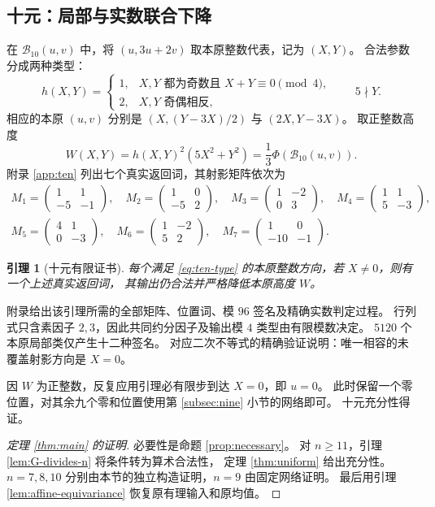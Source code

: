 \documentclass[UTF8,fontset=fandol,zihao=-4,a4paper]{ctexart}
\numberwithin{equation}{section}
\newtheorem{lemma}[theorem]{引理}
\theoremstyle{definition}
\newcommand{\B}{\mathcal B}
\newcommand{\mat}[4]{\begin{pmatrix}#1&#2\\#3&#4\end{pmatrix}}
\begin{document}
\subsection{十元：局部与实数联合下降}\label{subsec:ten-descent}

在 $\B_{10}(u,v)$ 中，将 $(u,3u+2v)$ 取本原整数代表，记为 $(X,Y)$。
合法参数分成两种类型：
\begin{equation}\label{eq:ten-type}
 h(X,Y)=
 \begin{cases}
 1,&X,Y\text{ 都为奇数且 }X+Y\equiv0\pmod4,\\
 2,&X,Y\text{ 奇偶相反},
 \end{cases}
 \qquad 5\nmid Y.
\end{equation}
相应的本原 $(u,v)$ 分别是
$(X,(Y-3X)/2)$ 与 $(2X,Y-3X)$。
取正整数高度
\begin{equation}\label{eq:ten-height}
 W(X,Y)=h(X,Y)^2(5X^2+Y^2)=\frac13\Phi(\B_{10}(u,v)).
\end{equation}
附录 \ref{app:ten} 列出七个真实返回词，其射影矩阵依次为
\begin{equation}\label{eq:ten-matrices}
\begin{gathered}
 M_1=\mat{1}{1}{-5}{-1},\quad M_2=\mat{1}{0}{-5}{2},\quad
 M_3=\mat{1}{-2}{0}{3},\quad M_4=\mat{1}{1}{5}{-3},\\
 M_5=\mat{4}{1}{0}{-3},\quad M_6=\mat{1}{-2}{5}{2},\quad
 M_7=\mat{1}{0}{-10}{-1}.
\end{gathered}
\end{equation}

\begin{lemma}[十元有限证书]\label{lem:ten-certificate}
每个满足 \eqref{eq:ten-type} 的本原整数方向，若 $X\ne0$，则有一个上述真实返回词，
其输出仍合法并严格降低本原高度 $W$。
\end{lemma}

附录给出该引理所需的全部矩阵、位置词、模 $96$ 签名及精确实数判定过程。
行列式只含素因子 $2,3$，因此共同约分因子及输出模 $4$ 类型由有限模数决定。
$5120$ 个本原局部类仅产生十二种签名。
对应二次不等式的精确验证说明：唯一相容的未覆盖射影方向是 $X=0$。

因 $W$ 为正整数，反复应用引理必有限步到达 $X=0$，即 $u=0$。
此时保留一个零位置，对其余九个零和位置使用第 \ref{subsec:nine} 小节的网络即可。
十元充分性得证。

\begin{proof}[定理 \ref{thm:main} 的证明]
必要性是命题 \ref{prop:necessary}。
对 $n\ge11$，引理 \ref{lem:G-divides-n} 将条件转为算术合法性，
定理 \ref{thm:uniform} 给出充分性。
$n=7,8,10$ 分别由本节的独立构造证明，$n=9$ 由固定网络证明。
最后用引理 \ref{lem:affine-equivariance} 恢复原有理输入和原均值。
\end{proof}
\end{document}
